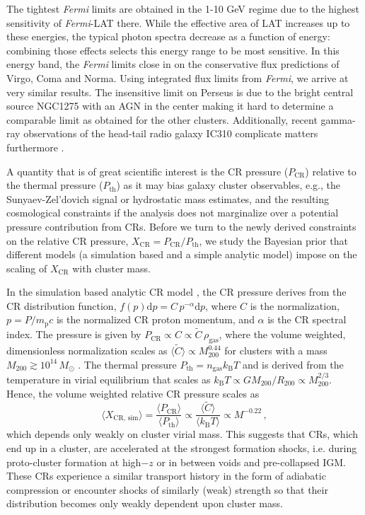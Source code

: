 \documentclass[10pt,aps,pra,reprint,amsmath,amsfonts,amssymb,showpacs,nofootinbib,floatfix]{revtex4-1}
\newcommand{\Fermi}{{\em Fermi}\xspace}
\newcommand{\rmn}{\mathrm}
\newcommand{\msun}{M_\odot}
\newcommand{\B}{\rmn{B}}
\newcommand{\bra}{\langle}
\newcommand{\ket}{\rangle}
\newcommand{\dd}{\rmn{d}}
\newcommand{\CR}{\rmn{CR}}
\newcommand{\mvir}{M_{200}}
\begin{document}
The tightest \Fermi limits are obtained in the 1-10 GeV regime due to
the highest sensitivity of \Fermi-LAT there. While the effective area
of LAT increases up to these energies, the typical photon spectra
decrease as a function of energy: combining those effects selects this
energy range to be most sensitive. In this energy band, the \Fermi
limits close in on the conservative flux predictions of Virgo, Coma
and Norma. Using integrated flux limits from \Fermi, we arrive at very
similar results. The insensitive limit on Perseus is due to the
bright central source NGC1275 with an AGN in the center
\cite{2010ATel.2916....1M} making it hard to determine a comparable
limit as obtained for the other clusters. Additionally, recent
gamma-ray observations of the head-tail radio galaxy IC310 complicate
matters furthermore \cite{2010ApJ...723L.207A,2010A&A...519L...6N}.

A quantity that is of great scientific interest is the CR pressure
($P_\CR$) relative to the thermal pressure ($P_\rmn{th}$) as it may
bias galaxy cluster observables, e.g., the Sunyaev-Zel’dovich signal
or hydrostatic mass estimates, and the resulting cosmological
constraints if the analysis does not marginalize over a potential
pressure contribution from CRs. Before we turn to the newly derived
constraints on the relative CR pressure, $X_\CR = P_\CR/P_\rmn{th}$,
we study the Bayesian prior that different models (a simulation based
and a simple analytic model) impose on the scaling of $X_\CR$ with
cluster mass.

In the simulation based analytic CR model \cite{2010MNRAS.409..449P},
the CR pressure derives from the CR distribution function, $f(p)\dd p =
C\,p^{-\alpha}\dd p$, where $C$ is the normalization, $p=P/m_\rmn{p}
c$ is the normalized CR proton momentum, and $\alpha$ is the CR
spectral index. The pressure is given by $P_\CR \propto C\propto
\tilde{C} \,\rho_\rmn{gas}$, where the volume weighted, dimensionless
normalization scales as $\bra\tilde{C}\ket\propto \mvir^{0.44}$ for clusters
with a mass $\mvir\gtrsim 10^{14}\,\msun$
\cite{2010MNRAS.409..449P}. The thermal pressure $P_\rmn{th} =
n_\rmn{gas} k_\B T$ and is derived from the temperature in virial
equilibrium that scales as $k_\B T \propto G \mvir/R_{200} \propto
\mvir^{2/3}$. Hence, the volume weighted relative CR pressure scales
as
\begin{equation}
    \bra X_{\CR,\,\rmn{sim}}\ket = \frac{\bra P_\CR\ket}{\bra
      P_\rmn{th}\ket} \propto \frac{\bra\tilde{C}\ket}{\bra k_\B
      T\ket} \propto M^{-0.22}\,,
\end{equation}
which depends only weakly on cluster virial mass. This suggests that
CRs, which end up in a cluster, are accelerated at the strongest
formation shocks, i.e. during proto-cluster formation at high$-z$ or
in between voids and pre-collapsed IGM. These CRs experience a
similar transport history in the form of adiabatic compression or
encounter shocks of similarly (weak) strength so that their
distribution becomes only weakly dependent upon cluster mass.
\end{document}
